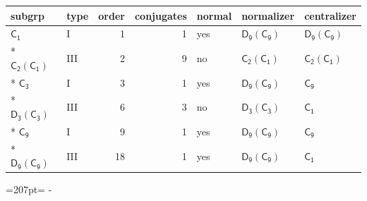 \documentclass[10pt,a4paper]{article}
\newcommand{\needspace}[1]{\par\penalty-100\begingroup\dimen0=#1\relax\dimen2=\pagegoal
  \advance\dimen2-\pagetotal\ifdim\dimen0>\dimen2\relax\ifdim\dimen2>0pt\vfil\break\fi\fi
  \endgroup}
\numberwithin{equation}{section}
\newcommand{\grp}[1]{\mathsf{#1}}
\begin{document}
{\small\begin{longtable}{@{}llrrlll@{}}\toprule
subgrp & type & order & conjugates & normal & normalizer & centralizer\\\midrule\endhead
\bottomrule\endfoot\endlastfoot
\href{../../../rotation/data/pdf/C1.pdf}{$\grp{C_{1}}$} & I & 1 & 1 & yes & \href{D9-C9.pdf}{$\grp{D_{9}}(\grp{C_{9}})$} & \href{D9-C9.pdf}{$\grp{D_{9}}(\grp{C_{9}})$}\\*
\href{C2-C1.pdf}{$\grp{C_{2}}(\grp{C_{1}})$} & III & 2 & 9 & no & \href{C2-C1.pdf}{$\grp{C_{2}}(\grp{C_{1}})$} & \href{C2-C1.pdf}{$\grp{C_{2}}(\grp{C_{1}})$}\\*
\href{../../../rotation/data/pdf/C3.pdf}{$\grp{C_{3}}$} & I & 3 & 1 & yes & \href{D9-C9.pdf}{$\grp{D_{9}}(\grp{C_{9}})$} & \href{../../../rotation/data/pdf/C9.pdf}{$\grp{C_{9}}$}\\*
\href{D3-C3.pdf}{$\grp{D_{3}}(\grp{C_{3}})$} & III & 6 & 3 & no & \href{D3-C3.pdf}{$\grp{D_{3}}(\grp{C_{3}})$} & \href{../../../rotation/data/pdf/C1.pdf}{$\grp{C_{1}}$}\\*
\href{../../../rotation/data/pdf/C9.pdf}{$\grp{C_{9}}$} & I & 9 & 1 & yes & \href{D9-C9.pdf}{$\grp{D_{9}}(\grp{C_{9}})$} & \href{../../../rotation/data/pdf/C9.pdf}{$\grp{C_{9}}$}\\*
\href{D9-C9.pdf}{$\grp{D_{9}}(\grp{C_{9}})$} & III & 18 & 1 & yes & \href{D9-C9.pdf}{$\grp{D_{9}}(\grp{C_{9}})$} & \href{../../../rotation/data/pdf/C1.pdf}{$\grp{C_{1}}$}\\
\bottomrule\end{longtable}}
\needspace{207pt}
\end{document}
